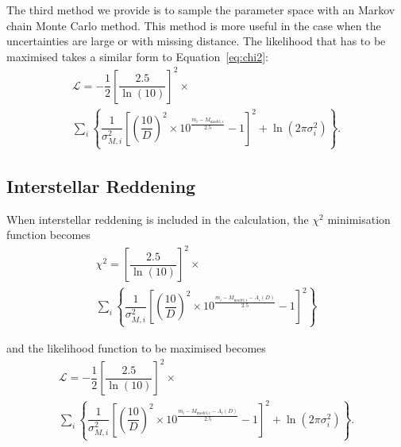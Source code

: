 \documentclass[fleqn,usenatbib]{rasti}
\begin{document}
The third method we provide is to sample the parameter space with an Markov chain
Monte Carlo method. This method is more useful in the case when the uncertainties
are large or with missing distance. The likelihood that has to be maximised takes
a similar form to Equation~\ref{eq:chi2}:
\begin{multline}
    \label{eq:likelihood}
    \mathcal{L} = -\dfrac{1}{2} \left[\dfrac{2.5}{\ln(10)}\right]^2 \times \\ \sum_{i} \left\{ 
    \dfrac{1}{\sigma_{M, i}^2} \left[ \left(\dfrac{10}{D}\right)^{2} \times 10^{\frac{m_{i} - M_{\mathrm{model}, i}}{2.5}} - 1 \right]^2
    + \ln(2\pi\sigma_i^2) \right\}.
\end{multline}

\subsection{Interstellar Reddening}
\label{sec:interstellar_reddening}
When interstellar reddening is included in the calculation, the $\chi^2$
minimisation function becomes
\begin{multline}
    \chi^{2} = \left[\dfrac{2.5}{\ln(10)}\right]^2 \times  \\
    \sum_{i}\left\{ \dfrac{1}{\sigma_{M, i}^2} \left[ \left(\dfrac{10}{D}\right)^{2} \times 10^{\frac{m_{i} - M_{\mathrm{model}, i} - A_{i}(D)}{2.5}} - 1 \right]^2 \right\}
\end{multline}

and the likelihood function to be maximised becomes
\begin{multline}
    \mathcal{L} = -\dfrac{1}{2} \left[\dfrac{2.5}{\ln(10)}\right]^2 \times \\ \sum_{i} \left\{ 
    \dfrac{1}{\sigma_{M, i}^2} \left[ \left(\dfrac{10}{D}\right)^{2} \times  10^{\frac{m_{i} - M_{\mathrm{model}, i} - A_{i}(D)}{2.5}} - 1 \right]^2
    + \ln(2\pi\sigma_i^2) \right\}.
\end{multline}
\end{document}
